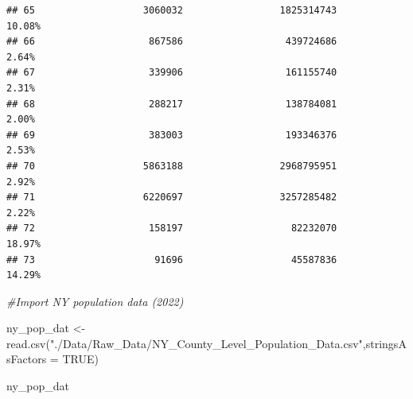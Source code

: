 \documentclass[
  12pt,
]{article}
\newenvironment{Shaded}{\begin{snugshade}}{\end{snugshade}}
\newcommand{\AttributeTok}[1]{\textcolor[rgb]{0.77,0.63,0.00}{#1}}
\newcommand{\CommentTok}[1]{\textcolor[rgb]{0.56,0.35,0.01}{\textit{#1}}}
\newcommand{\ConstantTok}[1]{\textcolor[rgb]{0.00,0.00,0.00}{#1}}
\newcommand{\FunctionTok}[1]{\textcolor[rgb]{0.00,0.00,0.00}{#1}}
\newcommand{\NormalTok}[1]{#1}
\newcommand{\OtherTok}[1]{\textcolor[rgb]{0.56,0.35,0.01}{#1}}
\newcommand{\StringTok}[1]{\textcolor[rgb]{0.31,0.60,0.02}{#1}}
\begin{document}
\begin{verbatim}
## 65                   3060032                 1825314743               10.08%
## 66                    867586                  439724686                2.64%
## 67                    339906                  161155740                2.31%
## 68                    288217                  138784081                2.00%
## 69                    383003                  193346376                2.53%
## 70                   5863188                 2968795951                2.92%
## 71                   6220697                 3257285482                2.22%
## 72                    158197                   82232070               18.97%
## 73                     91696                   45587836               14.29%
\end{verbatim}

\begin{Shaded}
\begin{Highlighting}[]
\CommentTok{\#Import NY population data (2022)}

\NormalTok{ny\_pop\_dat }\OtherTok{\textless{}{-}} \FunctionTok{read.csv}\NormalTok{(}\StringTok{"./Data/Raw\_Data/NY\_County\_Level\_Population\_Data.csv"}\NormalTok{,}\AttributeTok{stringsAsFactors =} \ConstantTok{TRUE}\NormalTok{)}

\NormalTok{ny\_pop\_dat}
\end{Highlighting}
\end{Shaded}
\end{document}
